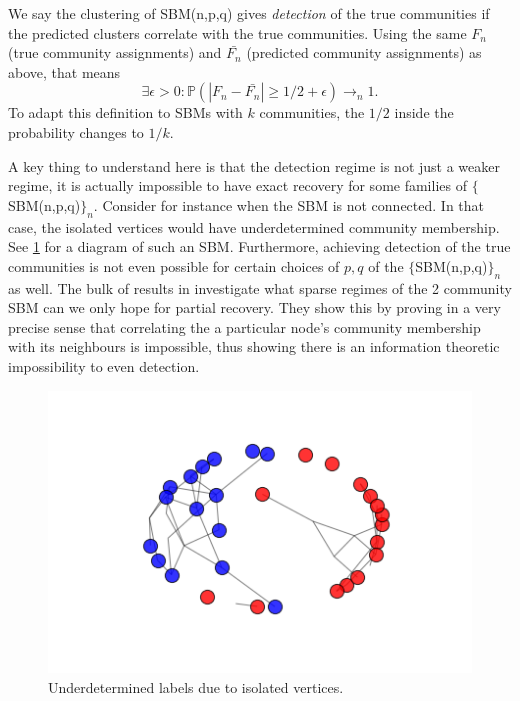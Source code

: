 \begin{definition}
We say the clustering of SBM(n,p,q) gives \textit{detection} of the true communities if the predicted clusters correlate with the true communities.  Using the same $F_n$ (true community assignments) and $\bar{F_n}$ (predicted community assignments) as above, that means $$\exists \epsilon > 0 : \mathbb{P}(|F_n-\bar{F_n}| \geq 1/2+\epsilon) \rightarrow_n 1.$$ To adapt this definition to SBMs with $k$ communities, the $1/2$ inside the probability changes to $1/k$.  
\end{definition}

A key thing to understand here is that the detection regime is not just a weaker regime, it is actually impossible to have exact recovery for some families of $\{$SBM(n,p,q)$\}_n$.  Consider for instance when the SBM is not connected. In that case, the isolated vertices would have underdetermined community membership.  See \ref{fig:sparse} for a diagram of such an SBM. Furthermore, achieving detection of the true communities is not even possible for certain choices of $p,q$ of the  $\{$SBM(n,p,q)$\}_n$ as well.  The bulk of results in \cite{MNS} investigate what sparse regimes of the 2 community SBM can we only hope for partial recovery. They show this by proving in a very precise sense that correlating the a particular node's community membership with its neighbours is impossible, thus showing there is an information theoretic impossibility to even detection.  


\begin{figure}[h]
\begin{center}
  \includegraphics[scale=0.5]{SBM_balanced_large_sparse.png}
  \caption{Underdetermined labels due to isolated vertices.}
  \label{fig:sparse}
 \end{center}
\end{figure}

